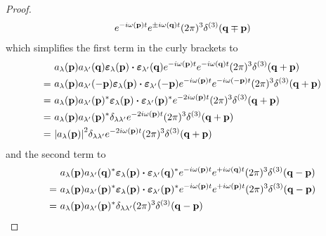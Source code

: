 \begin{proof}
\begin{equation*}
\begin{split}
			e^{-i\omega(\vb{p})t}
			e^{\pm i\omega(\vb{q})t}
			(2\pi)^3\delta^{(3)}(\vb{q}\mp\vb{p})
		\end{split}
	\end{equation*}
	which simplifies the first term in the curly brackets to
	\begin{equation*}
		\begin{split}
			&\
			a_\lambda(\vb{p})
			a_{\lambda^\prime}(\vb{q})
			\boldsymbol{\varepsilon}_\lambda(\vb{p})
			\vdot
			\boldsymbol{\varepsilon}_{\lambda^\prime}(\vb{q})
			e^{-i\omega(\vb{p})t}
			e^{-i\omega(\vb{q})t}
			(2\pi)^3\delta^{(3)}(\vb{q}+\vb{p})
			\\
			=&\
			a_\lambda(\vb{p})
			a_{\lambda^\prime}(-\vb{p})
			\boldsymbol{\varepsilon}_\lambda(\vb{p})
			\vdot
			\boldsymbol{\varepsilon}_{\lambda^\prime}(-\vb{p})
			e^{-i\omega(\vb{p})t}
			e^{-i\omega(-\vb{p})t}
			(2\pi)^3\delta^{(3)}(\vb{q}+\vb{p})
			\\
			=&\
			a_\lambda(\vb{p})
			a_{\lambda^\prime}(\vb{p})^*
			\boldsymbol{\varepsilon}_\lambda(\vb{p})
			\vdot
			\boldsymbol{\varepsilon}_{\lambda^\prime}(\vb{p})^*
			e^{-2i\omega(\vb{p})t}
			(2\pi)^3\delta^{(3)}(\vb{q}+\vb{p})
			\\
			=&\
			a_\lambda(\vb{p})
			a_{\lambda^\prime}(\vb{p})^*
			\delta_{\lambda\lambda^\prime}
			e^{-2i\omega(\vb{p})t}
			(2\pi)^3\delta^{(3)}(\vb{q}+\vb{p})
			\\
			=&\
			\abs{a_\lambda(\vb{p})}^2
			\delta_{\lambda\lambda^\prime}
			e^{-2i\omega(\vb{p})t}
			(2\pi)^3\delta^{(3)}(\vb{q}+\vb{p})
		\end{split}
	\end{equation*}
	and the second term to
	\begin{equation*}
		\begin{split}
			&\
			a_\lambda(\vb{p})
			a_{\lambda^\prime}(\vb{q})^*
			\boldsymbol{\varepsilon}_\lambda(\vb{p})
			\vdot
			\boldsymbol{\varepsilon}_{\lambda^\prime}(\vb{q})^*
			e^{-i\omega(\vb{p})t}
			e^{+i\omega(\vb{q})t}
			(2\pi)^3\delta^{(3)}(\vb{q}-\vb{p})
			\\
			=&\
			a_\lambda(\vb{p})
			a_{\lambda^\prime}(\vb{p})^*
			\boldsymbol{\varepsilon}_\lambda(\vb{p})
			\vdot
			\boldsymbol{\varepsilon}_{\lambda^\prime}(\vb{p})^*
			e^{-i\omega(\vb{p})t}
			e^{+i\omega(\vb{p})t}
			(2\pi)^3\delta^{(3)}(\vb{q}-\vb{p})
			\\
			=&\
			a_\lambda(\vb{p})
			a_{\lambda^\prime}(\vb{p})^*
			\delta_{\lambda\lambda^\prime}
			(2\pi)^3\delta^{(3)}(\vb{q}-\vb{p})
			\\

\end{split}
\end{equation*}
\end{proof}
